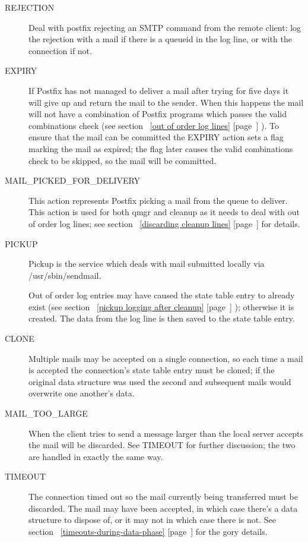 \documentclass[a4paper,12pt,draft]{article}
\newcommand{\refwithpage}[1]{%
    \empty{}\ref{#1} [page~\pageref{#1}]%
}
\begin{document}
\begin{description}
    \item [REJECTION] Deal with postfix rejecting an SMTP command from the
        remote client: log the rejection with a mail if there is a queueid
        in the log line, or with the connection if not.

    \item [EXPIRY] If Postfix has not managed to deliver a mail after
        trying for five days it will give up and return the mail to the
        sender.  When this happens the mail will not have a combination of
        Postfix programs which passes the valid combinations check (see
        section~\refwithpage{out of order log lines}).  To ensure that the
        mail can be committed the EXPIRY action sets a flag marking the
        mail as expired; the flag later causes the valid combinations check
        to be skipped, so the mail will be committed.

    \item [MAIL\_PICKED\_FOR\_DELIVERY] This action represents Postfix
        picking a mail from the queue to deliver. This action is used for
        both qmgr and cleanup as it needs to deal with out of order log
        lines; see section~\refwithpage{discarding cleanup lines} for
        details.

    \item [PICKUP] Pickup is the service which deals with mail submitted
        locally via /usr/sbin/sendmail. 

        Out of order log entries may have caused the state table entry to
        already exist (see section~\refwithpage{pickup logging after
        cleanup}); otherwise it is created.  The data from the log line is
        then saved to the state table entry.

    \item [CLONE] Multiple mails may be accepted on a single connection, so
        each time a mail is accepted the connection's state table entry
        must be cloned; if the original data structure was used the second
        and subsequent mails would overwrite one another's data.

    \item [MAIL\_TOO\_LARGE] When the client tries to send a message larger
        than the local server accepts the mail will be discarded.  See
        TIMEOUT for further discussion; the two are handled in exactly the
        same way.

    \item [TIMEOUT] The connection timed out so the mail currently being
        transferred must be discarded. The mail may have been accepted, in
        which case there's a data structure to dispose of, or it may not in
        which case there is not.  See
        section~\refwithpage{timeouts-during-data-phase} for the gory
        details.


\end{description}
\end{document}
